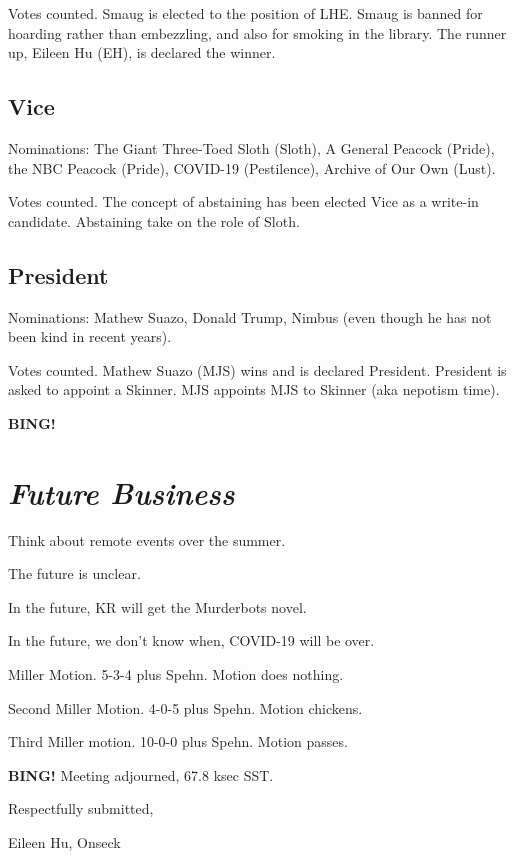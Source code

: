 \documentclass[10pt]{article}
\newcommand{\bing}{{\bf BING!} }
\newcommand{\goto}[1]{\bing \vskip 12pt \section*{{\em{#1}}}}
\newcommand{\ps}{ plus Spehn\xspace}
\newcommand{\onseck}{Eileen Hu, Onseck\xspace}
\begin{document}
Votes counted. Smaug is elected to the position of LHE. Smaug is banned for hoarding rather than embezzling, and also for smoking in the library. The runner up, Eileen Hu (EH), is declared the winner.

\subsection{Vice}

Nominations: The Giant Three-Toed Sloth (Sloth), A General Peacock (Pride), the NBC Peacock (Pride), COVID-19 (Pestilence), Archive of Our Own (Lust).

Votes counted. The concept of abstaining has been elected Vice as a write-in candidate. Abstaining take on the role of Sloth.

\subsection{President}

Nominations: Mathew Suazo, Donald Trump, Nimbus (even though he has not been kind in recent years).

Votes counted. Mathew Suazo (MJS) wins and is declared President. President is asked to appoint a Skinner. MJS appoints MJS to Skinner (aka nepotism time).

\goto{Future Business}

Think about remote events over the summer.

The future is unclear. 

In the future, KR will get the Murderbots novel.

In the future, we don't know when, COVID-19 will be over.

Miller Motion. 5-3-4 \ps. Motion does nothing.

Second Miller Motion. 4-0-5 \ps. Motion chickens.

Third Miller motion. 10-0-0 \ps. Motion passes.

\bing
\noindent
Meeting adjourned, 67.8 ksec SST.

\vspace{18pt}

\centerline{Respectfully submitted,}
\centerline{\onseck}
\end{document}
